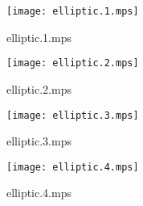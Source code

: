 \documentclass[letterpaper,10pt]{article}
\begin{document}
\begin{figure}
    \centering
    \texttt{[image: elliptic.1.mps]}
    \caption{elliptic.1.mps}
\end{figure}

\begin{figure}
    \centering
    \texttt{[image: elliptic.2.mps]}
    \caption{elliptic.2.mps}
\end{figure}

\begin{figure}
    \centering
    \texttt{[image: elliptic.3.mps]}
    \caption{elliptic.3.mps}
\end{figure}

\begin{figure}
    \centering
    \texttt{[image: elliptic.4.mps]}
    \caption{elliptic.4.mps}
\end{figure}
\end{document}
